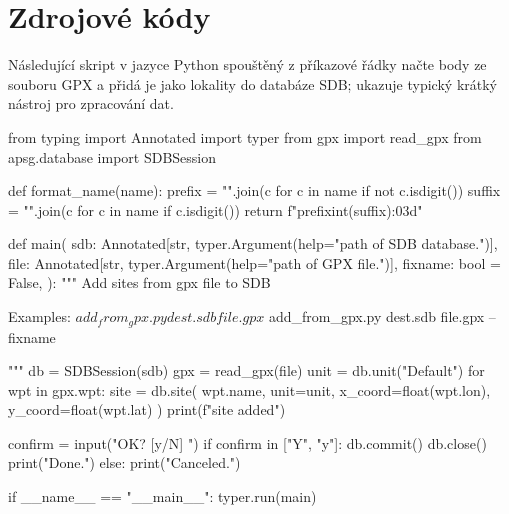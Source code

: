 \chapter{Zdrojové kódy}\label{app:kody}

Následující skript v jazyce Python spouštěný z příkazové řádky načte body ze souboru GPX a přidá je jako lokality do databáze SDB; ukazuje typický krátký nástroj pro zpracování dat.

\begin{code}[Python]
from typing import Annotated
import typer
from gpx import read_gpx
from apsg.database import SDBSession


def format_name(name):
    prefix = "".join(c for c in name if not c.isdigit())
    suffix = "".join(c for c in name if c.isdigit())
    return f"{prefix}{int(suffix):03d}"


def main(
    sdb: Annotated[str, typer.Argument(help="path of SDB database.")],
    file: Annotated[str, typer.Argument(help="path of GPX file.")],
    fixname: bool = False,
):
    """
    Add sites from gpx file to SDB

    Examples:
        $ add_from_gpx.py dest.sdb file.gpx
        $ add_from_gpx.py dest.sdb file.gpx --fixname

    """
    db = SDBSession(sdb)
    gpx = read_gpx(file)
    unit = db.unit("Default")
    for wpt in gpx.wpt:
        site = db.site(
            wpt.name,
            unit=unit, x_coord=float(wpt.lon), y_coord=float(wpt.lat)
        )
        print(f"{site} added")

    confirm = input("OK? [y/N] ")
    if confirm in ["Y", "y"]:
        db.commit()
        db.close()
        print("Done.")
    else:
        print("Canceled.")


if __name__ == "__main__":
    typer.run(main)
\end{code}

